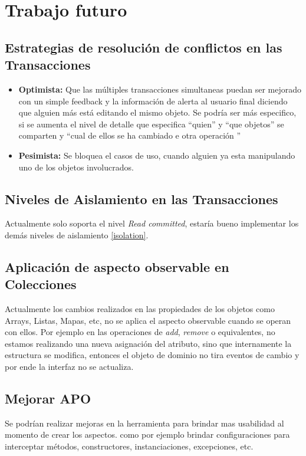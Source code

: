 
\section{Trabajo futuro}
\label{sec:futurework}


	\subsection{Estrategias de resolución de conflictos en las Transacciones}
	
		\begin{itemize}
	
			\item{\bf Optimista:} Que las múltiples  transacciones simultaneas puedan ser
			mejorado con un simple feedback y la información de alerta al
			usuario final diciendo que alguien más está editando el mismo objeto.
			Se podría ser más especifico, si se aumenta el nivel de detalle que especifica
			``quien'' y ``que objetos'' se comparten y ``cual de ellos se ha cambiado e
			otra operación ''
		
			\item{\bf Pesimista:} Se  bloquea el casos de uso, cuando alguien ya esta
			manipulando uno de los objetos involucrados. 
	
		\end{itemize}
		
	\subsection{Niveles de Aislamiento en las Transacciones}
	Actualmente solo soporta el nivel \emph{Read committed}, estaría bueno
	implementar los demás niveles de aislamiento \ref{isolation}.
	
	\subsection{Aplicación de aspecto observable en Colecciones}
		Actualmente los cambios realizados en las propiedades de los objetos como
		Arrays, Listas, Mapas, etc, no se aplica el aspecto observable cuando
		se operan con ellos. Por ejemplo en las operaciones de \emph{add}, \emph{remove} o
		equivalentes, no estamos realizando una nueva asignación del atributo, sino
		que internamente la estructura se modifica, entonces el objeto de dominio no
		tira eventos de cambio y por ende la interfaz no se actualiza.
		
	\subsection{Mejorar APO}
		Se podrían realizar mejoras en la herramienta para brindar mas usabilidad al
		momento de crear los aspectos. como por ejemplo brindar configuraciones para
		interceptar métodos, constructores, instanciaciones, excepciones, etc.
		
